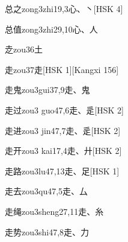 \begin{entry}{总之}{zong3zhi1}{9,3}{⼼、⼂}[HSK 4]
\end{entry}

\begin{entry}{总值}{zong3zhi2}{9,10}{⼼、⼈}
\end{entry}

\begin{entry}{赱}{zou3}{6}{⼟}
\end{entry}

\begin{entry}{走}{zou3}{7}{⾛}[HSK 1][Kangxi 156]
\end{entry}

\begin{entry}{走鬼}{zou3gui3}{7,9}{⾛、⿁}
\end{entry}

\begin{entry}{走过}{zou3 guo4}{7,6}{⾛、⾡}[HSK 2]
\end{entry}

\begin{entry}{走进}{zou3 jin4}{7,7}{⾛、⾡}[HSK 2]
\end{entry}

\begin{entry}{走开}{zou3 kai1}{7,4}{⾛、⼶}[HSK 2]
\end{entry}

\begin{entry}{走路}{zou3lu4}{7,13}{⾛、⾜}[HSK 1]
\end{entry}

\begin{entry}{走去}{zou3qu4}{7,5}{⾛、⼛}
\end{entry}

\begin{entry}{走绳}{zou3sheng2}{7,11}{⾛、⽷}
\end{entry}

\begin{entry}{走势}{zou3shi4}{7,8}{⾛、⼒}
\end{entry}

